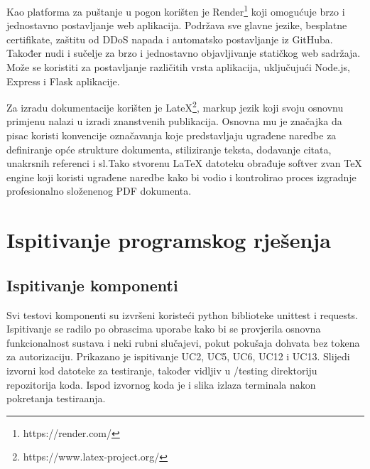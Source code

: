              Kao platforma za puštanje u pogon korišten je Render\footnote{https://render.com/} koji omogućuje brzo i jednostavno postavljanje web aplikacija. Podržava sve glavne jezike, besplatne certifikate, zaštitu od DDoS napada i automatsko postavljanje iz GitHuba. Također nudi i sučelje za brzo i jednostavno objavljivanje statičkog web sadržaja. Može se koristiti za postavljanje različitih vrsta aplikacija, uključujući Node.js, Express i Flask aplikacije.		 
			 
			 Za izradu dokumentacije korišten je LateX\footnote{https://www.latex-project.org/}, markup jezik koji svoju osnovnu primjenu nalazi u izradi znanstvenih publikacija. Osnovna mu je značajka da pisac koristi konvencije označavanja koje predstavljaju ugrađene naredbe za definiranje opće strukture dokumenta, stiliziranje teksta, dodavanje citata, unakrsnih referenci i sl.Tako stvorenu LaTeX datoteku obrađuje softver zvan TeX engine koji koristi ugrađene naredbe kako bi vodio i kontrolirao proces izgradnje profesionalno složenenog PDF dokumenta.
			\eject 
		
	
		\section{Ispitivanje programskog rješenja}
			
			
			\subsection{Ispitivanje komponenti}
			Svi testovi komponenti su izvršeni koristeći python biblioteke unittest i requests. Ispitivanje se radilo po obrascima uporabe kako bi se provjerila osnovna funkcionalnost sustava i neki rubni slučajevi, pokut pokušaja dohvata bez tokena za autorizaciju. Prikazano je ispitivanje UC2, UC5, UC6, UC12 i UC13. Slijedi izvorni kod datoteke za testiranje, također vidljiv u /testing direktoriju repozitorija koda. Ispod izvornog koda je i slika izlaza terminala nakon pokretanja testiraanja.

